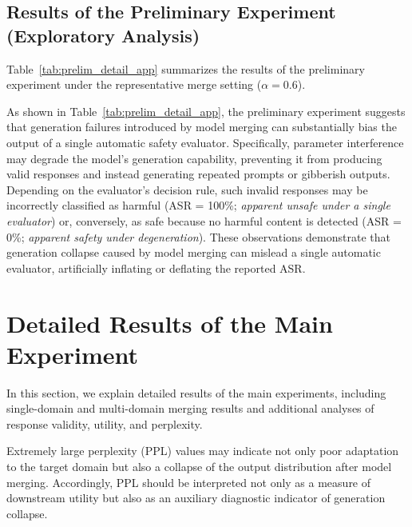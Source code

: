 \subsection{Results of the Preliminary Experiment (Exploratory Analysis)}

Table~\ref{tab:prelim_detail_app} summarizes the results of the preliminary experiment under the representative merge setting ($\alpha=0.6$).

As shown in Table~\ref{tab:prelim_detail_app}, the preliminary experiment suggests that generation failures introduced by model merging can substantially bias the output of a single automatic safety evaluator. Specifically, parameter interference may degrade the model's generation capability, preventing it from producing valid responses and instead generating repeated prompts or gibberish outputs. Depending on the evaluator's decision rule, such invalid responses may be incorrectly classified as harmful (ASR = 100\%; \emph{apparent unsafe under a single evaluator}) or, conversely, as safe because no harmful content is detected (ASR = 0\%; \emph{apparent safety under degeneration}). These observations demonstrate that generation collapse caused by model merging can mislead a single automatic evaluator, artificially inflating or deflating the reported ASR.


\section{Detailed Results of the Main Experiment}
\label{app:主実験の詳細結果}

In this section,  we explain detailed results of the main experiments, including single-domain and multi-domain merging results and additional analyses of response validity, utility, and perplexity.

Extremely large perplexity (PPL) values may indicate not only poor adaptation to the target domain but also a collapse of the output distribution after model merging. Accordingly, PPL should be interpreted not only as a measure of downstream utility but also as an auxiliary diagnostic indicator of generation collapse.

